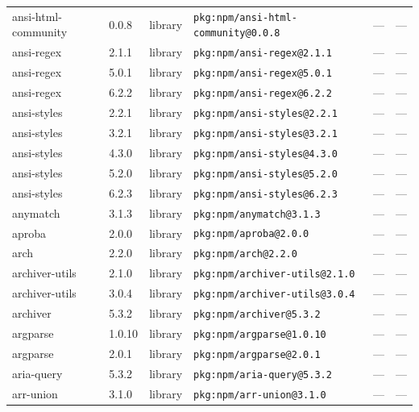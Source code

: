 \documentclass[11pt,a4paper]{article}
\begin{document}
\begin{longtable}{|p{4cm}|p{2cm}|p{1.6cm}|p{5cm}|p{1.5cm}|p{3.5cm}|}
\raggedright ansi-html-community & 0.0.8 & library & \small\texttt{pkg:npm/ansi-html-community@0.0.8} & — & \small — \\
\raggedright ansi-regex & 2.1.1 & library & \small\texttt{pkg:npm/ansi-regex@2.1.1} & — & \small — \\
\raggedright ansi-regex & 5.0.1 & library & \small\texttt{pkg:npm/ansi-regex@5.0.1} & — & \small — \\
\raggedright ansi-regex & 6.2.2 & library & \small\texttt{pkg:npm/ansi-regex@6.2.2} & — & \small — \\
\raggedright ansi-styles & 2.2.1 & library & \small\texttt{pkg:npm/ansi-styles@2.2.1} & — & \small — \\
\raggedright ansi-styles & 3.2.1 & library & \small\texttt{pkg:npm/ansi-styles@3.2.1} & — & \small — \\
\raggedright ansi-styles & 4.3.0 & library & \small\texttt{pkg:npm/ansi-styles@4.3.0} & — & \small — \\
\raggedright ansi-styles & 5.2.0 & library & \small\texttt{pkg:npm/ansi-styles@5.2.0} & — & \small — \\
\raggedright ansi-styles & 6.2.3 & library & \small\texttt{pkg:npm/ansi-styles@6.2.3} & — & \small — \\
\raggedright anymatch & 3.1.3 & library & \small\texttt{pkg:npm/anymatch@3.1.3} & — & \small — \\
\raggedright aproba & 2.0.0 & library & \small\texttt{pkg:npm/aproba@2.0.0} & — & \small — \\
\raggedright arch & 2.2.0 & library & \small\texttt{pkg:npm/arch@2.2.0} & — & \small — \\
\raggedright archiver-utils & 2.1.0 & library & \small\texttt{pkg:npm/archiver-utils@2.1.0} & — & \small — \\
\raggedright archiver-utils & 3.0.4 & library & \small\texttt{pkg:npm/archiver-utils@3.0.4} & — & \small — \\
\raggedright archiver & 5.3.2 & library & \small\texttt{pkg:npm/archiver@5.3.2} & — & \small — \\
\raggedright argparse & 1.0.10 & library & \small\texttt{pkg:npm/argparse@1.0.10} & — & \small — \\
\raggedright argparse & 2.0.1 & library & \small\texttt{pkg:npm/argparse@2.0.1} & — & \small — \\
\raggedright aria-query & 5.3.2 & library & \small\texttt{pkg:npm/aria-query@5.3.2} & — & \small — \\
\raggedright arr-union & 3.1.0 & library & \small\texttt{pkg:npm/arr-union@3.1.0} & — & \small — \\

\end{longtable}
\end{document}
